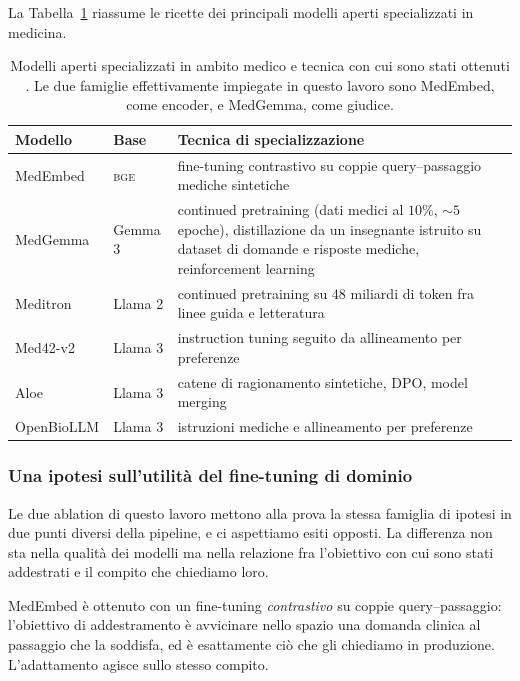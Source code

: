 \documentclass[pdflatex,sn-mathphys-num]{sn-jnl}
\theoremstyle{thmstyleone}
\theoremstyle{thmstyletwo}
\theoremstyle{thmstylethree}
\begin{document}
La Tabella~\ref{tab:modelli-medici} riassume le ricette dei principali modelli aperti specializzati in medicina.

\begin{table}[H]
\centering
\begin{tabular}{llp{6.6cm}}
\toprule
Modello & Base & Tecnica di specializzazione \\
\midrule
MedEmbed        & \textsc{bge}    & fine-tuning contrastivo su coppie query--passaggio mediche sintetiche \\
MedGemma        & Gemma 3         & continued pretraining (dati medici al $10\%$, $\sim 5$ epoche), distillazione da un insegnante istruito su dataset di domande e risposte mediche, reinforcement learning \\
Meditron        & Llama 2         & continued pretraining su $48$ miliardi di token fra linee guida e letteratura \\
Med42-v2        & Llama 3         & instruction tuning seguito da allineamento per preferenze \\
Aloe            & Llama 3         & catene di ragionamento sintetiche, DPO, model merging \\
OpenBioLLM      & Llama 3         & istruzioni mediche e allineamento per preferenze \\
\bottomrule
\end{tabular}
\caption{Modelli aperti specializzati in ambito medico e tecnica con cui sono stati ottenuti \cite{medgemma2025,chen2023meditron,christophe2024med42,gururajan2024aloe,medembed}. Le due famiglie effettivamente impiegate in questo lavoro sono MedEmbed, come encoder, e MedGemma, come giudice.}
\label{tab:modelli-medici}
\end{table}

\subsubsection{Una ipotesi sull'utilità del fine-tuning di dominio}\label{sec:ipotesi-dominio}

Le due ablation di questo lavoro mettono alla prova la stessa famiglia di ipotesi in due punti diversi della pipeline, e ci aspettiamo esiti opposti. La differenza non sta nella qualità dei modelli ma nella relazione fra l'obiettivo con cui sono stati addestrati e il compito che chiediamo loro.

MedEmbed è ottenuto con un fine-tuning \emph{contrastivo} su coppie query--passaggio: l'obiettivo di addestramento è avvicinare nello spazio una domanda clinica al passaggio che la soddisfa, ed è esattamente ciò che gli chiediamo in produzione. L'adattamento agisce sullo stesso compito.
\end{document}
